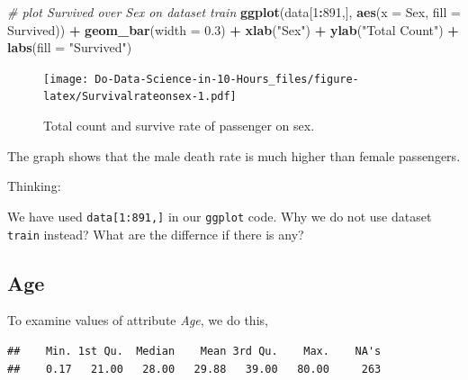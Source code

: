 \documentclass[
]{book}
\newenvironment{Shaded}{\begin{snugshade}}{\end{snugshade}}
\newcommand{\CommentTok}[1]{\textcolor[rgb]{0.56,0.35,0.01}{\textit{#1}}}
\newcommand{\DataTypeTok}[1]{\textcolor[rgb]{0.13,0.29,0.53}{#1}}
\newcommand{\DecValTok}[1]{\textcolor[rgb]{0.00,0.00,0.81}{#1}}
\newcommand{\FloatTok}[1]{\textcolor[rgb]{0.00,0.00,0.81}{#1}}
\newcommand{\KeywordTok}[1]{\textcolor[rgb]{0.13,0.29,0.53}{\textbf{#1}}}
\newcommand{\NormalTok}[1]{#1}
\newcommand{\OperatorTok}[1]{\textcolor[rgb]{0.81,0.36,0.00}{\textbf{#1}}}
\newcommand{\StringTok}[1]{\textcolor[rgb]{0.31,0.60,0.02}{#1}}
\begin{document}
\begin{Shaded}
\begin{Highlighting}[]
\CommentTok{# plot Survived over Sex on dataset train}
\KeywordTok{ggplot}\NormalTok{(data[}\DecValTok{1}\OperatorTok{:}\DecValTok{891}\NormalTok{,], }\KeywordTok{aes}\NormalTok{(}\DataTypeTok{x =}\NormalTok{ Sex, }\DataTypeTok{fill =}\NormalTok{ Survived)) }\OperatorTok{+}
\StringTok{  }\KeywordTok{geom_bar}\NormalTok{(}\DataTypeTok{width =} \FloatTok{0.3}\NormalTok{) }\OperatorTok{+}
\StringTok{  }\KeywordTok{xlab}\NormalTok{(}\StringTok{"Sex"}\NormalTok{) }\OperatorTok{+}
\StringTok{  }\KeywordTok{ylab}\NormalTok{(}\StringTok{"Total Count"}\NormalTok{) }\OperatorTok{+}
\StringTok{  }\KeywordTok{labs}\NormalTok{(}\DataTypeTok{fill =} \StringTok{"Survived"}\NormalTok{)}
\end{Highlighting}
\end{Shaded}

\begin{figure}
\centering
\texttt{[image: Do-Data-Science-in-10-Hours\_files/figure-latex/Survivalrateonsex-1.pdf]}
\caption{\label{fig:Survivalrateonsex}Total count and survive rate of passenger on sex.}
\end{figure}

The graph shows that the male death rate is much higher than female passengers.

\begin{rmdthinking}
Thinking:

We have used \texttt{data{[}1:891,{]}} in our \texttt{ggplot} code. Why we do not use dataset \texttt{train} instead? What are the differnce if there is any?
\end{rmdthinking}

\hypertarget{age}{%
\subsection{Age}\label{age}}

To examine values of attribute \emph{Age}, we do this,

\begin{Shaded}
\end{Shaded}

\begin{verbatim}
##    Min. 1st Qu.  Median    Mean 3rd Qu.    Max.    NA's 
##    0.17   21.00   28.00   29.88   39.00   80.00     263
\end{verbatim}
\end{document}
